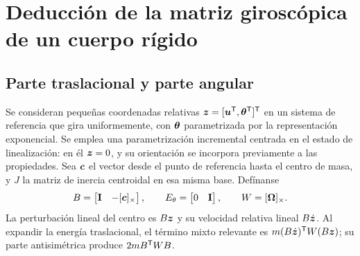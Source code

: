 \section{Deducción de la matriz giroscópica de un cuerpo rígido}
\subsection{Parte traslacional y parte angular}
Se consideran pequeñas coordenadas relativas $\bm{z}=[\bm{u}^{\mathsf T},\bm{\theta}^{\mathsf T}]^{\mathsf T}$ en un sistema de referencia que gira uniformemente, con $\bm{\theta}$ parametrizada por la representación exponencial. Se emplea una parametrización incremental centrada en el estado de linealización: en él $\bm{z}=0$, y su orientación se incorpora previamente a las propiedades. Sea $\bm{c}$ el vector desde el punto de referencia hasta el centro de masa, y $J$ la matriz de inercia centroidal en esa misma base. Defínanse
\begin{equation}
 B=\begin{bmatrix}\mathbf I&-[\bm{c}]_\times\end{bmatrix},\qquad
 E_\theta=\begin{bmatrix}0&\mathbf I\end{bmatrix},\qquad W=[\bm{\Omega}]_\times.
\end{equation}
La perturbación lineal del centro es $B\bm{z}$ y su velocidad relativa lineal $B\dot{\bm{z}}$. Al expandir la energía traslacional, el término mixto relevante es $m(B\dot{\bm{z}})^{\mathsf T}W(B\bm{z})$; su parte antisimétrica produce $2mB^{\mathsf T}WB$.

